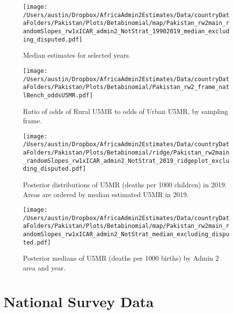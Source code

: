\documentclass[]{article}
\begin{document}
\begin{figure}
\centering
\texttt{[image: /Users/austin/Dropbox/AfricaAdmin2Estimates/Data/countryDataFolders/Pakistan/Plots/Betabinomial/map/Pakistan\_rw2main\_randomSlopes\_rw1xICAR\_admin2\_NotStrat\_19902019\_median\_excluding\_disputed.pdf]}
\caption{Median estimates for selected years.}
\end{figure}
\clearpage

\begin{figure}
    \centering
    \texttt{[image: /Users/austin/Dropbox/AfricaAdmin2Estimates/Data/countryDataFolders/Pakistan/Plots/Betabinomial/Pakistan\_rw2\_frame\_natlBench\_oddsU5MR.pdf]}
    \caption{Ratio of odds of Rural U5MR to odds of Urban U5MR, by sampling frame.}
\end{figure}
\clearpage



\begin{figure}
\centering
\texttt{[image: /Users/austin/Dropbox/AfricaAdmin2Estimates/Data/countryDataFolders/Pakistan/Plots/Betabinomial/ridge/Pakistan\_rw2main\_randomSlopes\_rw1xICAR\_admin2\_NotStrat\_2019\_ridgeplot\_excluding\_disputed.pdf]}
\caption{Posterior distributions of U5MR (deaths per 1000 children) in 2019. Areas are ordered by median estimated U5MR in 2019.}
\end{figure}
\clearpage
\begin{figure}
\centering
\texttt{[image: /Users/austin/Dropbox/AfricaAdmin2Estimates/Data/countryDataFolders/Pakistan/Plots/Betabinomial/map/Pakistan\_rw2main\_randomSlopes\_rw1xICAR\_admin2\_NotStrat\_median\_excluding\_disputed.pdf]}
\caption{Posterior medians of U5MR (deaths per 1000 births) by Admin 2 area and year.}
\end{figure}
\clearpage

\hypertarget{national-survey-data}{%
\section{National Survey Data}\label{national-survey-data}}
\end{document}
